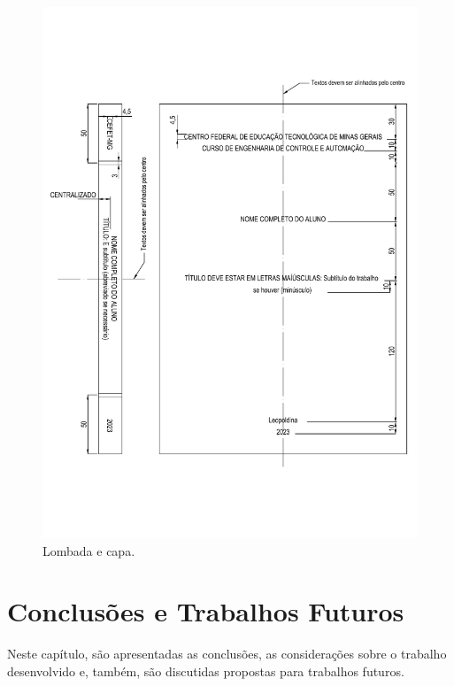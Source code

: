 \documentclass[
        oneside,      %
        english,			
        brazil			 
        ]{configcefetmglpd}
\begin{document}
\begin{figure}[h]
	\larguratexto{15cm}  %
	\caption{Lombada e capa.}
	\label{fig:lombada}
	\begin{center}
		\includegraphics[width=15cm]{lombada.pdf}
	\end{center}
\end{figure}

\chapter{Conclusões e Trabalhos Futuros}

Neste capítulo, são apresentadas as conclusões, as considerações sobre o trabalho desenvolvido e, também, são discutidas propostas para trabalhos futuros.
\end{document}
